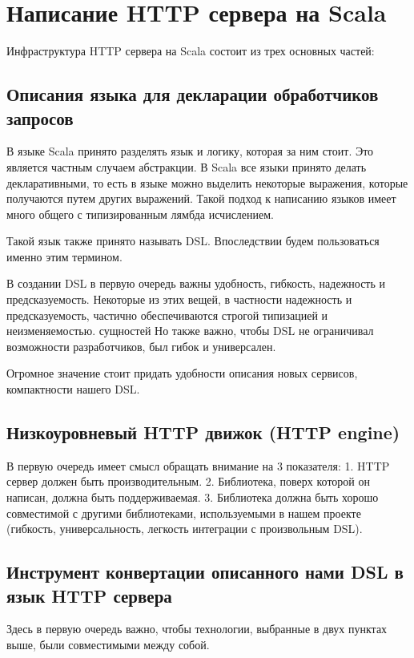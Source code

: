 \documentclass[14pt]{extarticle}
\begin{document}
    \section{Написание HTTP сервера на Scala}
    Инфраструктура HTTP сервера на Scala состоит из трех основных частей:

    \subsection{Описания языка для декларации обработчиков запросов}

    В языке Scala принято  разделять язык и логику, которая за ним стоит. Это является частным случаем абстракции.
    В Scala все языки принято делать декларативными, то есть в языке можно выделить некоторые выражения, которые
    получаются путем других выражений. Такой подход к написанию языков имеет много общего с типизированным лямбда
    исчислением.

    Такой язык также принято называть DSL. Впоследствии будем пользоваться именно этим термином.

    В создании DSL в первую очередь важны удобность, гибкость, надежность и
    предсказуемость. Некоторые из этих вещей, в частности надежность и предсказуемость, частично обеспечиваются строгой
    типизацией и
    неизменяемостью.
    сущностей
    Но также важно, чтобы DSL не ограничивал возможности разработчиков, был гибок и универсален.


    Огромное значение стоит придать удобности описания новых сервисов, компактности нашего DSL.

    \subsection{Низкоуровневый HTTP движок (HTTP engine)}
    В первую очередь имеет смысл обращать внимание на 3 показателя:
    1. HTTP сервер должен быть производительным.
    2. Библиотека, поверх которой он написан, должна быть поддерживаемая.
    3. Библиотека должна быть хорошо совместимой с другими библиотеками, используемыми в нашем проекте (гибкость,
    универсальность, легкость интеграции с произвольным DSL).

    \subsection{Инструмент конвертации описанного нами DSL в язык HTTP сервера}
    Здесь в первую очередь важно, чтобы технологии, выбранные в двух пунктах выше, были совместимыми между собой.
\end{document}
